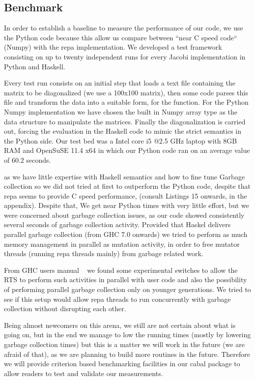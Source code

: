 \documentclass{tmr}
\begin{document}
\subsection{Benchmark}

In order to establish a baseline to measure the performance of our code, 
we use the Python code because this allow us compare between ``near C speed code``
(Numpy) with the repa implementation. We developed a test framework consisting 
on up to twenty independent runs for every Jacobi implementation in Python and Haskell.

Every test run consists on an initial step that loads a text file containing
the matrix to be diagonalized (we use a 100x100 matrix), then some code parses
this file and transform the data into a suitable form, for the  function. 
For the Python Numpy implementation we have chosen the built in Numpy array type
as the data structure to manipulate the matrices. Finally the diagonalization is
carried out, forcing the evaluation in the Haskell code to mimic the strict 
semantics in the Python side. Our test bed was a Intel core i5 @2.5 GHz 
laptop with 8GB RAM and OpenSuSE 11.4 x64 in which our Python code 
ran on an average value of 60.2 seconds. 

as we have little expertise with Haskell semantics and 
how to fine tune Garbage collection so we did not tried at first to outperform the Python
code, despite that repa seems to provide C speed performance, (consult Listings 15 onwards, in the appendix).
Despite that, We get near Python times with very little effort, but we were concerned about garbage collection 
issues, as our code showed consistently several seconds of garbage collection activity. Provided that Haskel
delivers parallel garbage collection (from GHC 7.0 onwards) we tried to perform as much memory management in parallel
as mutation activity, in order to free mutator threads (running repa threads mainly) from garbage related work.

From GHC users manual ~\cite{ghc} we found some experimental switches to allow the RTS to perform such activities in parallel
with user code and also the possibility of performing parallel garbage collection only on younger generations.
We tried to see if this setup would allow repa threads to run concurrently with garbage collection without  
disrupting each other.

Being almost newcomers on this arena, we still are not certain about what is going on, but in the end we manage to low the 
running times (mostly by lowering garbage collection times) but this is a matter we will work in the future 
(we are afraid of that), as we are planning to build more routines in the future. Therefore we will provide
 criterion based benchmarking facilities in our cabal package to allow readers to test and validate our measurements.
\end{document}
